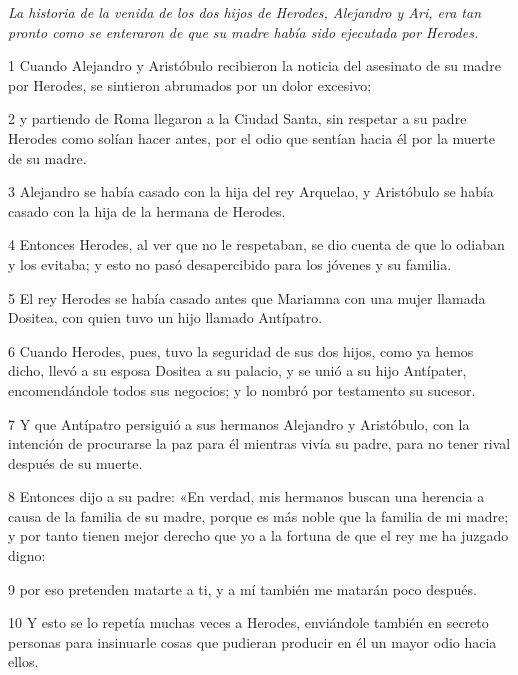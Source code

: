 \par \textit{La historia de la venida de los dos hijos de Herodes, Alejandro y Ari, era tan pronto como se enteraron de que su madre había sido ejecutada por Herodes.}

\par 1 Cuando Alejandro y Aristóbulo recibieron la noticia del asesinato de su madre por Herodes, se sintieron abrumados por un dolor excesivo;

\par 2 y partiendo de Roma llegaron a la Ciudad Santa, sin respetar a su padre Herodes como solían hacer antes, por el odio que sentían hacia él por la muerte de su madre.

\par 3 Alejandro se había casado con la hija del rey Arquelao, y Aristóbulo se había casado con la hija de la hermana de Herodes.

\par 4 Entonces Herodes, al ver que no le respetaban, se dio cuenta de que lo odiaban y los evitaba; y esto no pasó desapercibido para los jóvenes y su familia.

\par 5 El rey Herodes se había casado antes que Mariamna con una mujer llamada Dositea, con quien tuvo un hijo llamado Antípatro.

\par 6 Cuando Herodes, pues, tuvo la seguridad de sus dos hijos, como ya hemos dicho, llevó a su esposa Dositea a su palacio, y se unió a su hijo Antípater, encomendándole todos sus negocios; y lo nombró por testamento su sucesor.

\par 7 Y que Antípatro persiguió a sus hermanos Alejandro y Aristóbulo, con la intención de procurarse la paz para él mientras vivía su padre, para no tener rival después de su muerte.

\par 8 Entonces dijo a su padre: «En verdad, mis hermanos buscan una herencia a causa de la familia de su madre, porque es más noble que la familia de mi madre; y por tanto tienen mejor derecho que yo a la fortuna de que el rey me ha juzgado digno:

\par 9 por eso pretenden matarte a ti, y a mí también me matarán poco después.

\par 10 Y esto se lo repetía muchas veces a Herodes, enviándole también en secreto personas para insinuarle cosas que pudieran producir en él un mayor odio hacia ellos.

